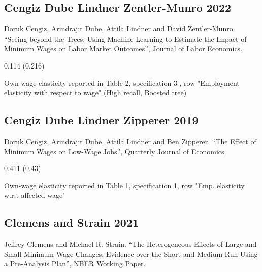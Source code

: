 \subsection*{Cengiz Dube Lindner Zentler-Munro 2022}
\vspace{-0.7em}

\noindent Doruk Cengiz, Arindrajit Dube, Attila Lindner and David Zentler-Munro. ``Seeing beyond the Trees: Using Machine Learning to Estimate the Impact of Minimum Wages on Labor Market Outcomes'', \href{https://doi.org/10.1086/718497}{Journal of Labor Economics}.

\vspace{0.7em}

 0.114 (0.216)

\vspace{0.7em}

 Own-wage elasticity reported in Table 2, specification 3 , row "Employment elasticity with respect to wage" (High recall, Boosted tree)

\subsection*{Cengiz Dube Lindner Zipperer 2019}
\vspace{-0.7em}

\noindent Doruk Cengiz, Arindrajit Dube, Attila Lindner and Ben Zipperer. ``The Effect of Minimum Wages on Low-Wage Jobs'', \href{https://doi.org/10.1093/qje/qjz014}{Quarterly Journal of Economics}.

\vspace{0.7em}

 0.411 (0.43)

\vspace{0.7em}

 Own-wage elasticity reported in Table 1, specification 1, row "Emp. elasticity w.r.t affected wage"

\subsection*{Clemens and Strain 2021}
\vspace{-0.7em}

\noindent Jeffrey Clemens and Michael R. Strain. ``The Heterogeneous Effects of Large and Small Minimum Wage Changes: Evidence over the Short and Medium Run Using a Pre-Analysis Plan'', \href{https://www.nber.org/system/files/working_papers/w29264/w29264.pdf}{NBER Working Paper}.


